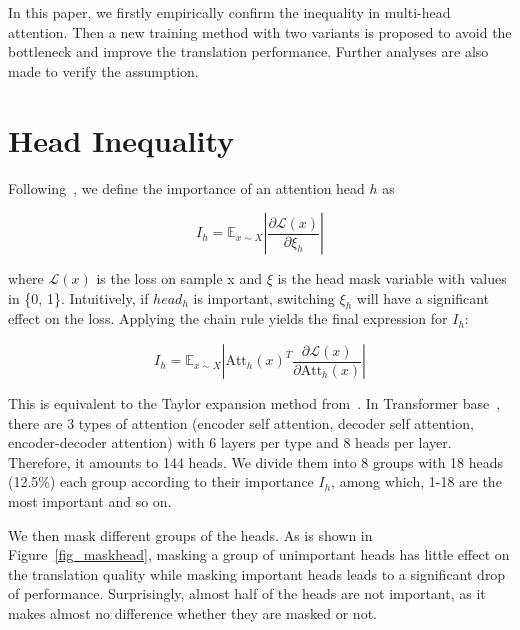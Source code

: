 \documentclass[11pt]{article}
\begin{document}
In this paper, we firstly empirically confirm the inequality in multi-head attention. Then a new training method with two variants 
is proposed to avoid the bottleneck and improve the translation performance. Further analyses are also made to verify the assumption.



\section{Head Inequality}


Following~, we define the importance of an attention head $h$ as 







\begin{equation}
    I_h = \mathbb{E}_{x \sim X} \left| \frac{\partial \mathcal{L}(x)}{\partial \xi_h} \right|
    \label{rbst_eq_importance}
\end{equation}



where $\mathcal{L}(x)$ is the loss on sample x and $\xi$ is the head mask variable with values in \{0, 1\}. Intuitively, if $head_h$ is important, switching $\xi_{h}$ will have a significant effect on the loss. Applying the chain rule yields the final expression for $I_h$:

\begin{equation}
    I_h = \mathbb{E}_{x \sim X} \left| \text{Att}_{h}(x)^T \frac{\partial \mathcal{L}(x)}{\partial \text{Att}_{h}(x)} \right|
\end{equation}

This is equivalent to the Taylor expansion method from~.
In Transformer base~\cite{Vaswani2017AttentionIA}, there are 3 types of attention (encoder self attention, decoder self attention, encoder-decoder attention) with 6 layers per type and 8 heads per layer. Therefore, it amounts to 144 heads. 
We divide them into 8 groups with 18 heads (12.5\%) each group according to their importance $I_h$, among which, 1-18 are the most important and so on.



We then mask different groups of the heads. As is shown in Figure~\ref{fig_maskhead}, masking a group of unimportant heads has little effect on the translation quality while masking important heads leads to a significant drop of performance. Surprisingly, almost half of the heads are not important, as it makes almost no difference whether they are masked or not.
\end{document}
